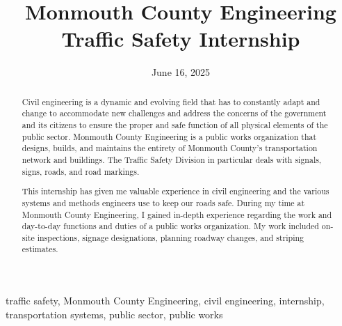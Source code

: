 ﻿\documentclass[12pt,conference,onecolumn]{IEEEtran}
\title{Monmouth County Engineering Traffic Safety Internship}
\author{\IEEEauthorblockN{Aadarsh Kumar}\IEEEauthorblockA{Science \& Engineering\\Manalapan High School\\Englishtown, NJ\\425akumar@frhsd.com}}
\date{June 16, 2025}
\newcommand{\keywords}{traffic safety, Monmouth County Engineering, civil engineering, internship, transportation systems, public sector, public works}
\begin{document}
\maketitle 

\begin{abstract}
Civil engineering is a dynamic and evolving field that has to constantly adapt and change to accommodate new challenges and address the concerns of the government and its citizens to ensure the proper and safe function of all physical elements of the public sector. Monmouth County Engineering is a public works organization that designs, builds, and maintains the entirety of Monmouth County's transportation network and buildings. The Traffic Safety Division in particular deals with signals, signs, roads, and road markings. 

This internship has given me valuable experience in civil engineering and the various systems and methods engineers use to keep our roads safe. During my time at Monmouth County Engineering, I gained in-depth experience regarding the work and day-to-day functions and duties of a public works organization. My work included on-site inspections, signage designations, planning roadway changes, and striping estimates.
\end{abstract}

\begin{IEEEkeywords}
\keywords
\end{IEEEkeywords}
\end{document}
